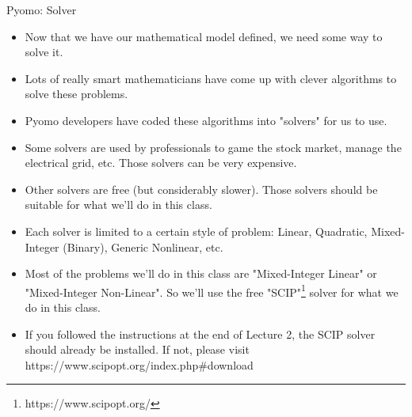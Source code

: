\documentclass[10pt, aspectratio=169]{beamer}
\begin{document}
\begin{frame}{Pyomo: Solver}
    \begin{itemize}
        \item Now that we have our mathematical model defined, we need some way to solve it.
        \item Lots of really smart mathematicians have come up with clever algorithms to solve these problems.
        \item Pyomo developers have coded these algorithms into "solvers" for us to use.
        \item Some solvers are used by professionals to game the stock market, manage the electrical grid, etc. Those solvers can be very expensive.
        \item Other solvers are free (but considerably slower). Those solvers should be suitable for what we'll do in this class.
        \item Each solver is limited to a certain style of problem: Linear, Quadratic, Mixed-Integer (Binary), Generic Nonlinear, etc.
        \item Most of the problems we'll do in this class are "Mixed-Integer Linear" or "Mixed-Integer Non-Linear". So we'll use the free "SCIP"\footnote{https://www.scipopt.org/} solver for what we do in this class.
        \item If you followed the instructions at the end of Lecture 2, the SCIP solver should already be installed. If not, please visit https://www.scipopt.org/index.php\#download
    \end{itemize}
\end{frame}
\end{document}
